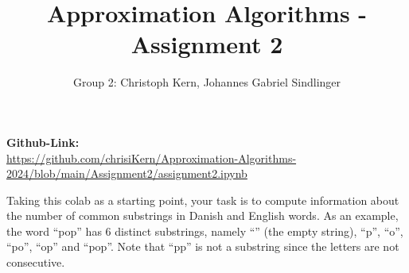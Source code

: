 \documentclass{article}
\title{Approximation Algorithms - Assignment 2}
\author{Group 2: Christoph Kern, Johannes Gabriel Sindlinger}
\begin{document}
\maketitle

\begin{center}
    \textbf{Github-Link:} \\
\url{https://github.com/chrisiKern/Approximation-Algorithms-2024/blob/main/Assignment2/assignment2.ipynb}
\end{center}


Taking this colab as a starting point, your task is to compute information about the number of common substrings in Danish and English words. As an example, the word ``pop'' has 6 distinct substrings, namely ``'' (the empty string), ``p'', ``o'', ``po'', ``op'' and ``pop''. Note that ``pp'' is not a substring since the letters are not consecutive.
\end{document}
